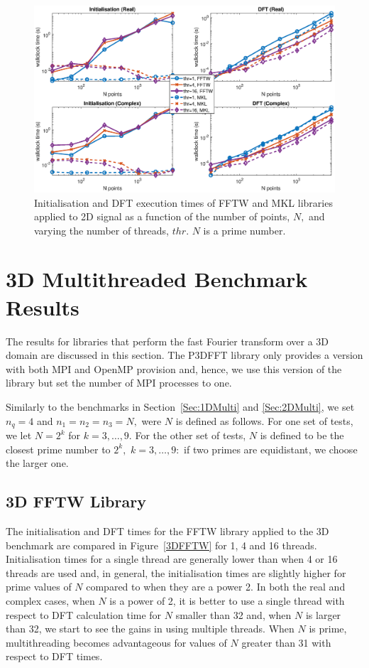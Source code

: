 \documentclass[a4paper]{article}
\begin{document}
\begin{figure}[htb]
    \centering
    \includegraphics[width=\linewidth]{../results/fftw_mkl_prime_2d_thr.eps}
  \caption{Initialisation and DFT execution times of FFTW and MKL libraries applied to 2D signal as a function of the
    number of points, $N,$ and varying the number of threads, $thr.$ $N$ is a prime number.}
  \label{2DFFTWMKLPrime}
\end{figure}





\section{3D Multithreaded Benchmark Results}\label{Sec:3DMulti}
The results for libraries that perform the fast Fourier transform over
a 3D domain are discussed in this section. The P3DFFT library only
provides a version with both MPI and OpenMP provision and, hence, we
use this version of the library but set the number of MPI processes to
one.

Similarly to the benchmarks in Section~\ref{Sec:1DMulti} and \ref{Sec:2DMulti}, we set
$n_q=4$ and $n_1=n_2=n_3=N,$ were $N$ is defined as follows.  For one
set of tests, we let $N=2^k$ for $k=3,\ldots,9.$ For the other set of
tests, $N$ is defined to be the closest prime number to $2^k,$
$k=3,\ldots,9:$ if two primes are equidistant, we choose the larger
one.

\subsection{3D FFTW Library}\label{Sec:3DFFTW}
The initialisation and DFT times for the FFTW library applied to the
3D benchmark are compared in Figure~\ref{3DFFTW} for 1, 4 and 16
threads. Initialisation times for a single thread are generally lower
than when 4 or 16 threads are used and, in general, the initialisation
times are slightly higher for prime values of $N$ compared to when
they are a power 2. In both the real and complex cases, when $N$ is a
power of 2, it is better to use a single thread with respect to DFT
calculation time for $N$ smaller than 32 and, when $N$ is larger than
32, we start to see the gains in using multiple threads. When $N$ is
prime, multithreading becomes advantageous for values of $N$ greater
than 31 with respect to DFT times. 
\end{document}
